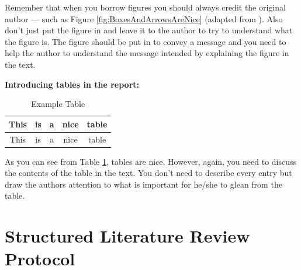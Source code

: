 Remember that when you borrow figures you should always credit the original author --- such as Figure \ref{fig:BoxesAndArrowsAreNice} (adapted from \citet{authorson10:_secon_best_paper_in_world}). Also don't just put the figure in and leave it to the author to try to understand what the figure is. The figure should be put in to convey a message and you need to help the author to understand the message intended by explaining the figure in the text. 

\vspace{0.5cm}

\noindent
{\bf Introducing tables in the report: }\\

\begin{table}[htbp]
\begin{center}
\begin{tabular}{|c|c|c|c|c|}\hline\hline
This & is & a & nice & table\\\hline
This & is & a & nice & table\\\hline\hline
\end{tabular}
\caption{Example Table}
\end{center}
\label{tab:ExampleTable}
\end{table}%

As you can see from Table \ref{tab:ExampleTable}, tables are nice. However, again, you need to discuss the contents of the table in the text. You don't need to describe every entry but draw the authors attention to what is important for he/she to glean from the table. 
\fi

\section{Structured Literature Review Protocol}
\label{sec:literature_review}

